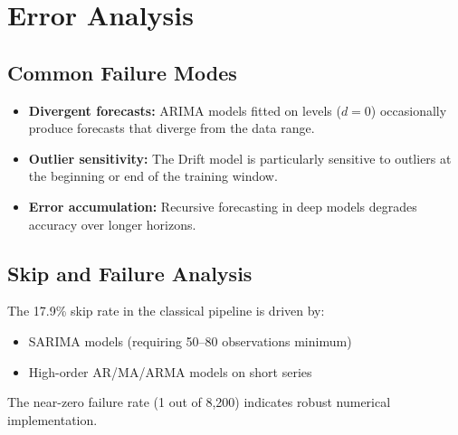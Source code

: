 \section{Error Analysis}

\subsection{Common Failure Modes}

\begin{itemize}
    \item \textbf{Divergent forecasts:} ARIMA models fitted on levels ($d=0$) occasionally produce forecasts that diverge from the data range.
    \item \textbf{Outlier sensitivity:} The Drift model is particularly sensitive to outliers at the beginning or end of the training window.
    \item \textbf{Error accumulation:} Recursive forecasting in deep models degrades accuracy over longer horizons.
\end{itemize}

\subsection{Skip and Failure Analysis}

The 17.9\% skip rate in the classical pipeline is driven by:
\begin{itemize}
    \item SARIMA models (requiring 50--80 observations minimum)
    \item High-order AR/MA/ARMA models on short series
\end{itemize}

The near-zero failure rate (1 out of 8,200) indicates robust numerical implementation.
